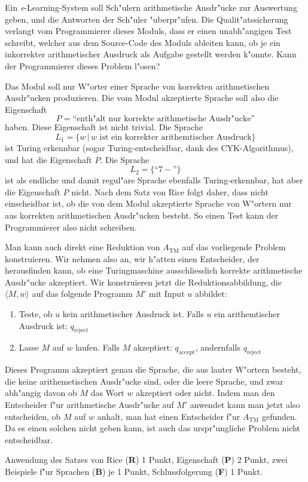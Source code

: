 Ein {\it e}-Learning-System soll Sch"ulern arithmetische Ausdr"ucke
zur Auswertung geben, und die Antworten der Sch"uler "uberpr"ufen.
Die Qualit"atssicherung verlangt vom Programmierer dieses Moduls, dass
er einen unabh"angigen Test schreibt, welcher aus dem Source-Code
des Moduls ableiten kann, ob je ein inkorrekter arithmetischer Ausdruck
als Aufgabe gestellt werden k"onnte. Kann der Programmierer dieses
Problem l"osen?

\begin{loesung}
Das Modul soll nur W"orter einer Sprache von korrekten arithmetischen
Ausdr"ucken produzieren.
Die vom Modul akzeptierte Sprache soll also die Eigenschaft
\[
P=\text{``enth"alt nur korrekte arithmetische Ausdr"ucke''}
\]
haben. 
Diese Eigenschaft ist nicht trivial. Die Sprache
\[
L_1=\{w\,|\,\text{$w$ ist ein korrekter arithemtischer Ausdruck}\}
\]
ist Turing erkennbar (sogar Turing-entscheidbar, dank des CYK-Algorithmus),
und hat die Eigenschaft $P$.
Die Sprache
\[
L_2=\{ \text{``$7-$''}\}
\]
ist als endliche und damit regul"are Sprache ebenfalls Turing-erkennbar,
hat aber die Eigenschaft $P$ nicht. Nach dem Satz von Rice folgt daher,
dass nicht einscheidbar ist, ob die von dem Modul akzeptierte Sprache
von W"ortern nur aus korrekten arithmetischen Ausdr"ucken besteht.
So einen Test kann der Programmierer also nicht schreiben.
\end{loesung}

\begin{loesung}
Man kann auch direkt eine Reduktion von $A_{\text{TM}}$ auf das vorliegende
Problem konstruieren.  Wir nehmen also an, wir h"atten einen Entscheider,
der herausfinden kann, ob eine Turingmaschine ausschliesslich korrekte
arithmetische Ausdr"ucke akzeptiert. Wir konstruieren jetzt die
Reduktionsabbildung, die $\langle M,w\rangle$ auf das folgende
Programm $M'$ mit Input $u$ abbildet:
\begin{enumerate}
\item Teste, ob $u$ kein arithmetischer Ausdruck ist. Falls 
$u$ ein arithemtischer Ausdruck ist: $q_\text{reject}$
\item Lasse $M$ auf $w$ laufen. Falls $M$ akzeptiert: $q_\text{accept}$,
andernfalls $q_\text{reject}$
\end{enumerate}
Dieses Programm akzeptiert genau die Sprache, die aus lauter W"ortern
besteht, die keine arithemetischen Ausdr"ucke sind, oder die leere
Sprache, und zwar abh"angig davon ob $M$ das Wort $w$ akzeptiert
oder nicht. Indem man den Entscheider f"ur arithmetische Ausdr"ucke
auf $M'$ anwendet kann man jetzt also entscheiden, ob $M$ auf $w$
anhalt, man hat einen Entscheider f"ur $A_\text{TM}$ gefunden.
Da es einen solchen nicht geben kann, ist auch das urspr"ungliche
Problem nicht entscheidbar.
\end{loesung}

\begin{bewertung}
Anwendung des Satzes von Rice ({\bf R}) 1 Punkt,
Eigenschaft ({\bf P}) 2 Punkt,
zwei Beispiele f"ur Sprachen ({\bf B}) je 1 Punkt,
Schlussfolgerung ({\bf F}) 1 Punkt.
\end{bewertung}
